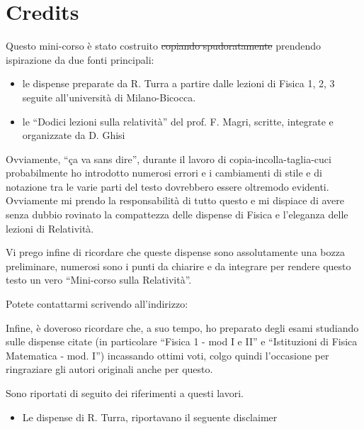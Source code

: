 \chapter[Credits]{Credits}

Questo mini-corso è stato costruito \sout{copiando spudoratamente} prendendo ispirazione da due fonti principali:
\begin{itemize}
 \item le dispense preparate da R. Turra a partire dalle lezioni di Fisica 1, 2, 3 seguite all'università di Milano-Bicocca.
 \item le ``Dodici lezioni sulla relatività'' del prof. F. Magri, scritte, integrate e organizzate da D. Ghisi
\end{itemize}

Ovviamente, ``ça va sans dire'', durante il lavoro di copia-incolla-taglia-cuci probabilmente ho introdotto numerosi errori e i cambiamenti di 
stile e di notazione tra le varie parti del testo dovrebbero essere oltremodo evidenti. Ovviamente mi prendo la responsabilità di tutto questo
e mi dispiace di avere senza dubbio rovinato la compattezza delle dispense di Fisica e 
l'eleganza delle lezioni di Relatività.

Vi prego infine di ricordare che queste dispense sono assolutamente una bozza preliminare, numerosi sono i punti da chiarire e da integrare
per rendere questo testo un vero ``Mini-corso sulla Relatività''.

Potete contattarmi scrivendo all'indirizzo:
\begin{center}
\end{center}
\rmfamily\upshape

Infine, è doveroso ricordare che, a suo tempo, ho preparato degli esami studiando sulle dispense citate (in particolare ``Fisica 1 - mod I e II'' e ``Istituzioni 
di Fisica Matematica - mod. I'') incassando ottimi voti, colgo quindi l'occasione per ringraziare gli autori originali anche per questo. 

Sono riportati di seguito dei riferimenti a questi lavori.

\begin{itemize}
 \item Le dispense di R. Turra, riportavano il seguente disclaimer
\end{itemize}

